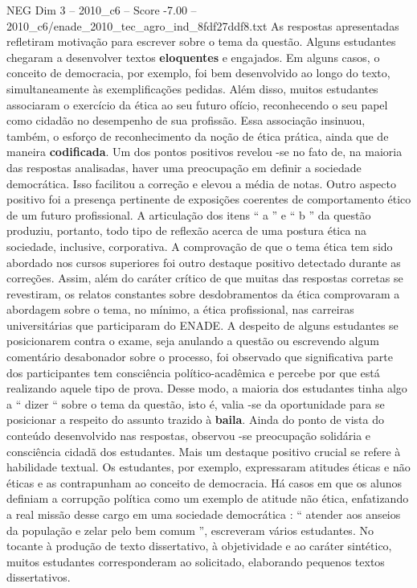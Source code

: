 \begin{textsample}{NEG Dim 3 – 2010\_c6 – Score -7.00 – 2010\_c6/enade\_2010\_tec\_agro\_ind\_8fdf27ddf8.txt}
As respostas apresentadas refletiram motivação para escrever sobre o tema da questão.
Alguns estudantes chegaram a desenvolver textos \textbf{eloquentes} e engajados.
Em alguns casos, o conceito de democracia, por exemplo, foi bem desenvolvido ao longo do texto, simultaneamente às exemplificações pedidas.
Além disso, muitos estudantes associaram o exercício da ética ao seu futuro ofício, reconhecendo o seu papel como cidadão no desempenho de sua profissão.
Essa associação insinuou, também, o esforço de reconhecimento da noção de ética prática, ainda que de maneira \textbf{codificada}.
Um dos pontos positivos revelou -se no fato de, na maioria das respostas analisadas, haver uma preocupação em definir a sociedade democrática.
Isso facilitou a correção e elevou a média de notas.
Outro aspecto positivo foi a presença pertinente de exposições coerentes de comportamento ético de um futuro profissional.
A articulação dos itens “ a ” e “ b ” da questão produziu, portanto, todo tipo de reflexão acerca de uma postura ética na sociedade, inclusive, corporativa.
A comprovação de que o tema ética tem sido abordado nos cursos superiores foi outro destaque positivo detectado durante as correções.
Assim, além do caráter crítico de que muitas das respostas corretas se revestiram, os relatos constantes sobre desdobramentos da ética comprovaram a abordagem sobre o tema, no mínimo, a ética profissional, nas carreiras universitárias que participaram do ENADE.
A despeito de alguns estudantes se posicionarem contra o exame, seja anulando a questão ou escrevendo algum comentário desabonador sobre o processo, foi observado que significativa parte dos participantes tem consciência político-acadêmica e percebe por que está realizando aquele tipo de prova.
Desse modo, a maioria dos estudantes tinha algo a “ dizer “ sobre o tema da questão, isto é, valia -se da oportunidade para se posicionar a respeito do assunto trazido à \textbf{baila}.
Ainda do ponto de vista do conteúdo desenvolvido nas respostas, observou -se preocupação solidária e consciência cidadã dos estudantes.
Mais um destaque positivo crucial se refere à habilidade textual.
Os estudantes, por exemplo, expressaram atitudes éticas e não éticas e as contrapunham ao conceito de democracia.
Há casos em que os alunos definiam a corrupção política como um exemplo de atitude não ética, enfatizando a real missão desse cargo em uma sociedade democrática : “ atender aos anseios da população e zelar pelo bem comum ”, escreveram vários estudantes.
No tocante à produção de texto dissertativo, à objetividade e ao caráter sintético, muitos estudantes corresponderam ao solicitado, elaborando pequenos textos dissertativos.

\end{textsample}
